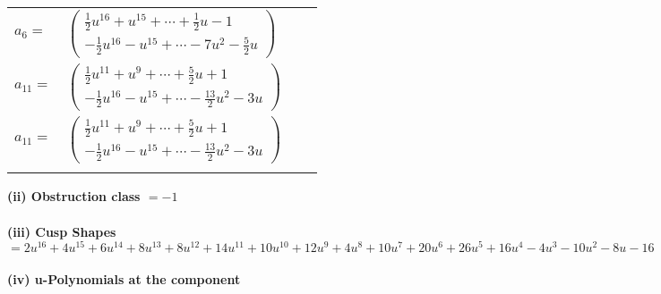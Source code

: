 \documentclass[1p]{elsarticle_modified}
\theoremstyle{definition}
\begin{document}
\begin{tabular}{m{7pt} m{180pt} m{7pt} m{180pt} }
\flushright $a_{6}=$&$\begin{pmatrix}\frac{1}{2} u^{16}+u^{15}+\cdots+\frac{1}{2} u-1\\-\frac{1}{2} u^{16}- u^{15}+\cdots-7 u^2-\frac{5}{2} u\end{pmatrix}$ \\
\flushright $a_{11}=$&$\begin{pmatrix}\frac{1}{2} u^{11}+u^9+\cdots+\frac{5}{2} u+1\\-\frac{1}{2} u^{16}- u^{15}+\cdots-\frac{13}{2} u^2-3 u\end{pmatrix}$\\ \flushright $a_{11}=$&$\begin{pmatrix}\frac{1}{2} u^{11}+u^9+\cdots+\frac{5}{2} u+1\\-\frac{1}{2} u^{16}- u^{15}+\cdots-\frac{13}{2} u^2-3 u\end{pmatrix}$\\&\end{tabular}
\flushleft \textbf{(ii) Obstruction class $= -1$}\\~\\
\flushleft \textbf{(iii) Cusp Shapes $= 2 u^{16}+4 u^{15}+6 u^{14}+8 u^{13}+8 u^{12}+14 u^{11}+10 u^{10}+12 u^9+4 u^8+10 u^7+20 u^6+26 u^5+16 u^4-4 u^3-10 u^2-8 u-16$}\\~\\
\newpage\renewcommand{\arraystretch}{1}
\flushleft \textbf{(iv) u-Polynomials at the component}\newline \\
\end{document}
